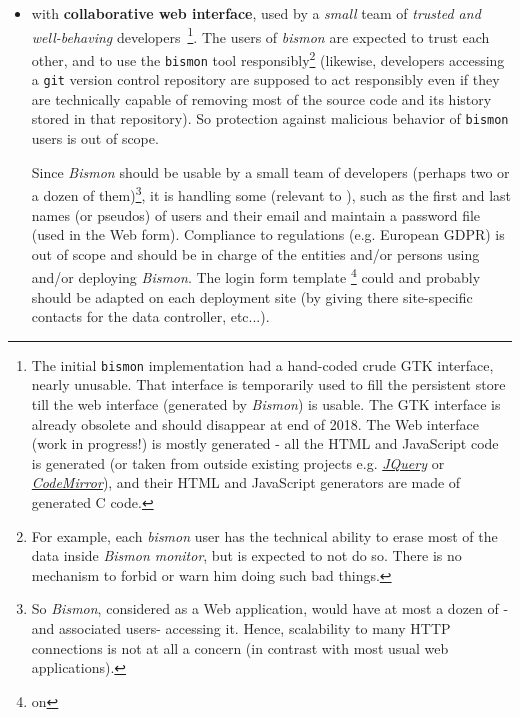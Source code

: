 \begin{itemize}
    \item with \textbf{collaborative web interface},  used
      by a \emph{small} team of \emph{trusted and well-behaving}
      developers~\footnote{The initial \texttt{bismon} implementation
        had a hand-coded crude GTK interface, nearly unusable. That
        interface is temporarily used to fill the persistent store
        till the web interface (generated by \emph{Bismon}) is
        usable. The GTK interface is already obsolete and should
        disappear at end of 2018. The Web interface (work in
        progress!) is mostly generated - all the HTML and JavaScript
        code is generated (or taken from outside existing projects
        e.g. \href{http://jquery.com/}{\emph{JQuery}} or
        \href{http://codemirror.net/}{\emph{CodeMirror}}), and their
        HTML and JavaScript generators are made of generated C
        code.}. The users of \emph{bismon} are expected to trust each
      other, and to use the \texttt{bismon} tool
      responsibly\footnote{For example, each \emph{bismon} user has
        the technical ability to erase most of the data inside
        \textit{Bismon monitor}, but is expected to not do so. There
        is no mechanism to forbid or warn him doing such bad things.}
      (likewise, developers accessing a \texttt{git} version control
      repository are supposed to act responsibly even if they are
      technically capable of removing most of the source code and its
      history stored in that repository). So protection against
      malicious behavior of \texttt{bismon} users is out of scope.

      Since \textit{Bismon} should be usable by a small team of
      developers (perhaps two or a dozen of them)\footnote{So
        \textit{Bismon}, considered as a Web application, would have
        at most a dozen of  -and associated
        users- accessing it. Hence, scalability to many HTTP
        connections is not at all a concern (in contrast with most
        usual web applications).}, it is handling some  (relevant to ), such as
      the first and last names (or pseudos) of users and their email
      and maintain a password file (used in the Web
       form). Compliance to regulations
      (e.g. European GDPR) is out of scope and should be in charge of
      the entities and/or persons using and/or deploying
      \textit{Bismon}. The login form template \footnote{on
        }
      could and probably should be adapted on each deployment site (by
      giving there site-specific contacts for the data controller,
      etc...).


\end{itemize}
